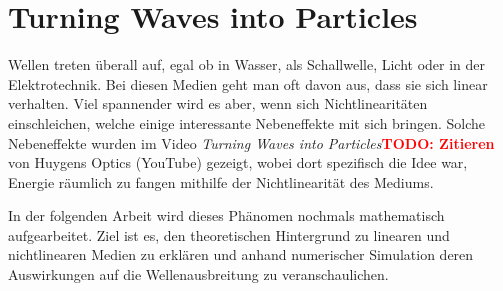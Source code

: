 %
%
%
%
\newcommand{\mytodo}[1]{\textbf{\textcolor{red}{TODO: #1}}}
\newcommand{\mynote}[1]{\textbf{\textcolor{orange}{NOTE: #1}}}
\chapter{Turning Waves into Particles\label{chapter:particles}}
\begin{refsection}

Wellen treten überall auf, egal ob in Wasser, als Schallwelle, Licht oder in der Elektrotechnik.
Bei diesen Medien geht man oft davon aus, dass sie sich linear verhalten.
Viel spannender wird es aber, wenn sich Nichtlinearitäten einschleichen, 
welche einige interessante Nebeneffekte mit sich bringen.
Solche Nebeneffekte wurden im Video \emph{Turning Waves into Particles}\mytodo{Zitieren} von Huygens Optics (YouTube) gezeigt,
wobei dort spezifisch die Idee war, Energie räumlich zu fangen mithilfe der Nichtlinearität des Mediums.

In der folgenden Arbeit wird dieses Phänomen nochmals mathematisch aufgearbeitet. %
Ziel ist es, den theoretischen Hintergrund zu linearen und nichtlinearen Medien zu erklären 
und anhand numerischer Simulation deren Auswirkungen auf die Wellenausbreitung zu veranschaulichen.







\end{refsection}
